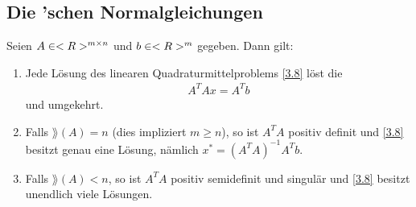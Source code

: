 \subsection{Die 'schen Normalgleichungen}

\begin{proposition}
	Seien $A\in<R>^{m\times n}$ und $b\in<R>^m$ gegeben. Dann gilt:
	\begin{enumerate}[label=(\alph*)]
		\item Jede Lösung des linearen Quadraturmittelproblems \cref{3.8} löst die \\ 
		\begin{align}
			\label{3.11}
			A^TAx = A^Tb
		\end{align}
		und umgekehrt.
		\item Falls $\rang(A)=n$ (dies impliziert $m\ge n$), so ist $A^TA$ positiv definit und \cref{3.8} besitzt genau eine Lösung, nämlich $x^*=(A^TA)^{-1}A^Tb$.
		\item Falls $\rang(A)<n$, so ist $A^TA$ positiv semidefinit und singulär und \cref{3.8} besitzt unendlich viele Lösungen.
	\end{enumerate}
\end{proposition}
